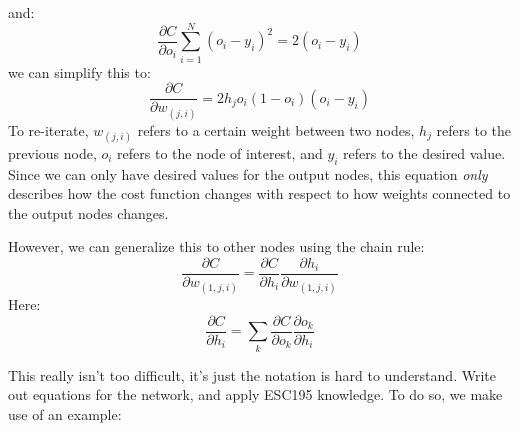 \documentclass{article}
\begin{document}
    and:
    \begin{equation}
        \frac{\partial C}{\partial o_i} \sum_{i=1}^N (o_i-y_i)^2 = 2(o_i - y_i)
    \end{equation}
    we can simplify this to:
    \begin{equation}
        \boxed{
            \frac{\partial C}{\partial w_{(j,i)}} = 
            2h_j o_i (1-o_i) (o_i - y_i)
        }
    \end{equation}
    To re-iterate, $w_{(j,i)}$ refers to a certain weight between two nodes, $h_j$ refers to the previous node, $o_i$ refers to the node of interest, and $y_i$ refers to the desired value. Since we can only have desired values for the output nodes, this equation \textit{only} describes how the cost function changes with respect to how weights connected to the output nodes changes.

    However, we can generalize this to other nodes using the chain rule:
    \begin{equation}
        \frac{\partial C}{\partial w_{(1,j,i)}}
    = \frac{\partial C}{\partial h_i} \frac{\partial h_i}{\partial w_{(1,j,i)}}
    \end{equation}
    Here:
    \begin{equation}
        \frac{\partial C}{\partial h_i} = \sum_k \frac{\partial C}{\partial o_k}\frac{\partial o_k}{\partial h_i}
    \end{equation}
    \begin{idea}
        This really isn't too difficult, it's just the notation is hard to understand. Write out equations for the network, and apply ESC195 knowledge. To do so, we make use of an example:
    \end{idea}
\end{document}

